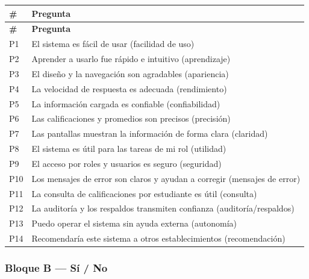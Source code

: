 \documentclass[11pt,a4paper]{article}
\begin{document}
{\small
\begin{longtable}{|p{}|p{}|}
\rowcolor{UTECblue}\color{white}\bfseries \# & \color{white}\bfseries Pregunta \\ \hline
\endfirsthead
\rowcolor{UTECblue}\color{white}\bfseries \# & \color{white}\bfseries Pregunta \\ \hline
\endhead
P1 & El sistema es fácil de usar (facilidad de uso) \\ \hline
P2 & Aprender a usarlo fue rápido e intuitivo (aprendizaje) \\ \hline
P3 & El diseño y la navegación son agradables (apariencia) \\ \hline
P4 & La velocidad de respuesta es adecuada (rendimiento) \\ \hline
P5 & La información cargada es confiable (confiabilidad) \\ \hline
P6 & Las calificaciones y promedios son precisos (precisión) \\ \hline
P7 & Las pantallas muestran la información de forma clara (claridad) \\ \hline
P8 & El sistema es útil para las tareas de mi rol (utilidad) \\ \hline
P9 & El acceso por roles y usuarios es seguro (seguridad) \\ \hline
P10 & Los mensajes de error son claros y ayudan a corregir (mensajes de error) \\ \hline
P11 & La consulta de calificaciones por estudiante es útil (consulta) \\ \hline
P12 & La auditoría y los respaldos transmiten confianza (auditoría/respaldos) \\ \hline
P13 & Puedo operar el sistema sin ayuda externa (autonomía) \\ \hline
P14 & Recomendaría este sistema a otros establecimientos (recomendación) \\ \hline
\end{longtable}}


\subsubsection*{Bloque B --- Sí / No}
\end{document}
